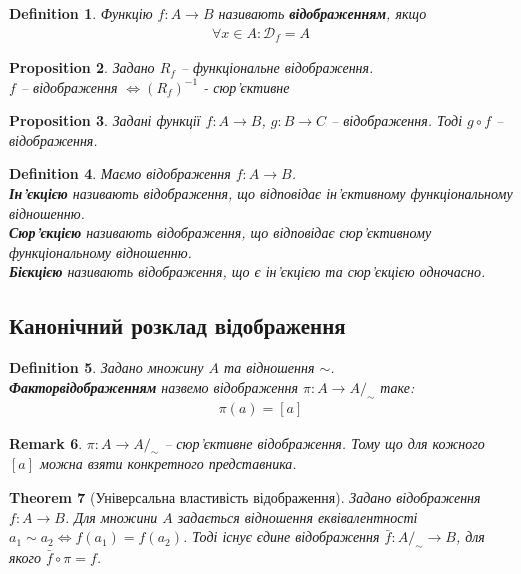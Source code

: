 \documentclass[a4paper, 14pt]{extarticle}
\theoremstyle{theoremdd}
\newtheorem{theorem}{Theorem}[subsection]
\theoremstyle{theoremdd}
\newtheorem{definition}[theorem]{Definition}
\theoremstyle{theoremdd}
\theoremstyle{theoremdd}
\theoremstyle{theoremdd}
\theoremstyle{theoremdd}
\theoremstyle{theoremdd}
\theoremstyle{theoremdd}
\theoremstyle{theoremdd}
\newtheorem{proposition}[theorem]{Proposition}
\theoremstyle{theoremdd}
\theoremstyle{theoremdd}
\newtheorem{remark}[theorem]{Remark}
\theoremstyle{theoremdd}
\theoremstyle{theoremdd}
\theoremstyle{theoremdd}
\theoremstyle{theoremdd}
\begin{document}
\begin{definition}
Функцію $f \colon A \to B$ називають \textbf{відображенням}, якщо
\begin{align*}
\forall x \in A: \mathcal{D}_f = A
\end{align*}
\end{definition}

\begin{proposition}
Задано $R_f$ -- функціональне відображення.\\
$f$ -- відображення $\iff (R_f)^{-1}$ - сюр'єктивне
\end{proposition}

\begin{proposition}
Задані функції $f \colon A \to B$, $g \colon B \to C$ -- відображення. Тоді $g \circ f$ -- відображення.
\end{proposition}

\begin{definition} Маємо відображення $f \colon A \to B$.\\
\textbf{Ін'єкцією} називають відображення, що відповідає ін'єктивному функціональному відношенню.\\
\textbf{Сюр'єкцією} називають відображення, що відповідає сюр'єктивному функціональному відношенню.\\
\textbf{Бієкцією} називають відображення, що є ін'єкцією та сюр'єкцією одночасно.
\end{definition}

\subsection{Канонічний розклад відображення}
\begin{definition}
Задано множину $A$ та відношення $\sim$.\\
\textbf{Факторвідображенням} назвемо відображення $\pi \colon A \to A/_\sim$ таке:
\begin{align*}
\pi(a) = [a]
\end{align*}
\end{definition}

\begin{remark}
$\pi \colon A \to A/_\sim$ -- сюр'єктивне відображення. Тому що для кожного $[a]$ можна взяти конкретного представника.
\end{remark}

\begin{theorem}[Універсальна властивість відображення]
Задано відображення $f \colon A \to B$. Для множини $A$ задається відношення еквівалентності $a_1 \sim a_2 \iff f(a_1) = f(a_2)$. Тоді існує єдине відображення $\bar{f} \colon A/_\sim \to B$, для якого $\bar{f} \circ \pi = f$.
\begin{figure}[H]
\centering
{}
\end{figure}
\end{theorem}
\end{document}
